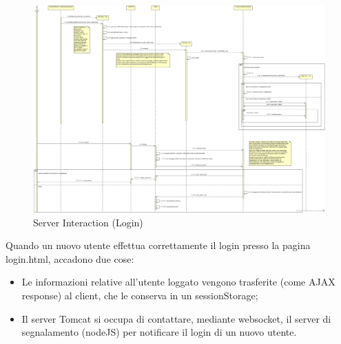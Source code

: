 \begin{landscape}
\begin{center}

\begin{figure}[!htbp]
	\centering
	\includegraphics[scale = .31]{img/sequence_serverint.png}
	\caption{Server Interaction (Login)}
	\label{gfx:serverinteractionlogin}
\end{figure}
\end{center}	
\end{landscape}%

Quando un nuovo utente effettua correttamente il login presso la pagina login.html, accadono due cose:
\begin{itemize}
\item Le informazioni relative all'utente loggato vengono trasferite (come AJAX response) al client, che le conserva in un sessionStorage;
\item Il server Tomcat si occupa di contattare, mediante websocket, il server di segnalamento (nodeJS) per notificare il login di un nuovo utente.
\end{itemize}

